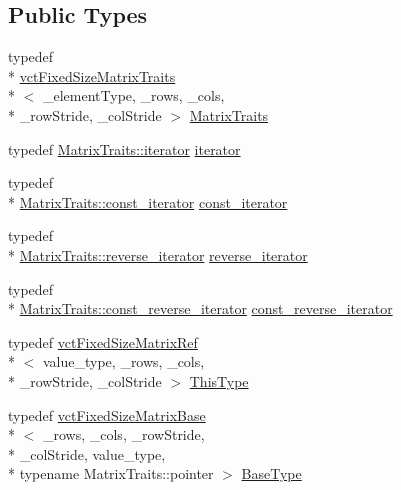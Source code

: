 \subsection*{Public Types}
\begin{DoxyCompactItemize}
\item 
typedef \\*
\hyperlink{classvct_fixed_size_matrix_traits}{vct\-Fixed\-Size\-Matrix\-Traits}\\*
$<$ \-\_\-element\-Type, \-\_\-rows, \-\_\-cols, \\*
\-\_\-row\-Stride, \-\_\-col\-Stride $>$ \hyperlink{classvct_fixed_size_matrix_ref_a9716291cd710aec62841490659e783da}{Matrix\-Traits}
\item 
typedef \hyperlink{classvct_fixed_size_matrix_traits_a677065481ada218e2559cdec92e97fd8}{Matrix\-Traits\-::iterator} \hyperlink{classvct_fixed_size_matrix_ref_ab9d9f2e3e1370846c2da44b10e4ad9f8}{iterator}
\item 
typedef \\*
\hyperlink{classvct_fixed_size_matrix_traits_a8f7178fb03f45772c705fba16e08065d}{Matrix\-Traits\-::const\-\_\-iterator} \hyperlink{classvct_fixed_size_matrix_ref_a7c8a96934427f6a5a5c410abe5c0fccb}{const\-\_\-iterator}
\item 
typedef \\*
\hyperlink{classvct_fixed_size_matrix_traits_aa132098455575ae9bc4962c994273baa}{Matrix\-Traits\-::reverse\-\_\-iterator} \hyperlink{classvct_fixed_size_matrix_ref_a052eeff62ac55a54af1179c7fd8d246f}{reverse\-\_\-iterator}
\item 
typedef \\*
\hyperlink{classvct_fixed_size_matrix_traits_a362cff0931f811552609307e80af3eab}{Matrix\-Traits\-::const\-\_\-reverse\-\_\-iterator} \hyperlink{classvct_fixed_size_matrix_ref_acfd6ce4ca9ac345fc5ed261df8743c42}{const\-\_\-reverse\-\_\-iterator}
\item 
typedef \hyperlink{classvct_fixed_size_matrix_ref}{vct\-Fixed\-Size\-Matrix\-Ref}\\*
$<$ value\-\_\-type, \-\_\-rows, \-\_\-cols, \\*
\-\_\-row\-Stride, \-\_\-col\-Stride $>$ \hyperlink{classvct_fixed_size_matrix_ref_a29a621c8e22f250f9033e539ad219f95}{This\-Type}
\item 
typedef \hyperlink{classvct_fixed_size_matrix_base}{vct\-Fixed\-Size\-Matrix\-Base}\\*
$<$ \-\_\-rows, \-\_\-cols, \-\_\-row\-Stride, \\*
\-\_\-col\-Stride, value\-\_\-type, \\*
typename Matrix\-Traits\-::pointer $>$ \hyperlink{classvct_fixed_size_matrix_ref_a83c7be1d6fbc75488c082cb53ebcb2ed}{Base\-Type}
\end{DoxyCompactItemize}
